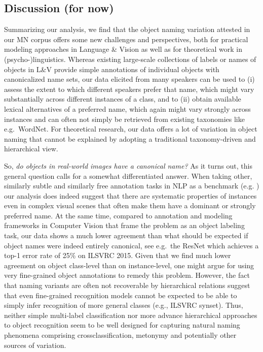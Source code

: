 

\subsection{Discussion (for now)}
\label{subsec:discuss}

Summarizing our analysis, we find that the object naming variation attested in our MN corpus offers some new challenges and perspectives, both for practical modeling approaches in Language \& Vision as well as for theoretical work in (psycho-)linguistics. 
Whereas existing large-scale collections of labels or names of objects in L\&V provide simple annotations of individual objects with canonicalized name sets, our data elicited from many speakers can be used to (i) assess the extent to which different speakers prefer that name, which might vary substantially across different instances of a class, and to (ii) obtain available lexical alternatives of a preferred name, which again might vary strongly across instances and can often not simply be retrieved from existing taxonomies like e.g.\ WordNet. 
For theoretical research, our data offers a lot of variation in object naming that cannot be explained by adopting a traditional taxonomy-driven and hierarchical view.

So, \textit{do objects in real-world images have a canonical name?} As it turns out, this general question calls for a somewhat differentiated answer.
When taking other, similarly subtle and similarly free annotation tasks in NLP as a benchmark (e.g. )
our analysis does indeed suggest that there are systematic properties of instances even in complex visual scenes that often make them have a dominant or strongly preferred name.
  At the same time, compared to annotation and modeling frameworks in Computer Vision that frame the problem as an object labeling task, our data shows a much lower agreement than what should be expected if object names were indeed entirely canonical, see e.g.\ the ResNet which achieves a top-1 error rate of 25\% on ILSVRC 2015.
Given that we find much lower agreement on object class-level than on instance-level, one might argue for using very fine-grained object annotations to remedy this problem. 
However, the fact that naming variants are often not recoverable by hierarchical relations suggest that even fine-grained recognition models cannot be expected to be able to simply infer recognition of more general classes (e.g., ILSVRC synset). Thus, neither simple multi-label classification nor more advance hierarchical approaches to object recognition seem to be well designed for capturing natural naming phenomena comprising crossclassification, metonymy and potentially other sources of variation.

